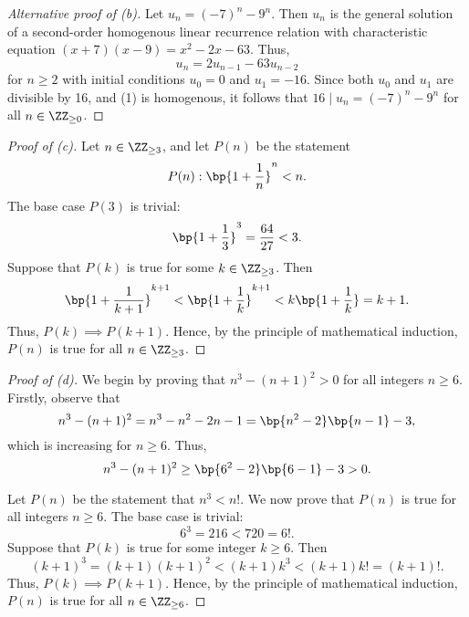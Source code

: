 \begin{proof}[Alternative proof of \emph(b)]
    Let $u_n = (-7)^n - 9^n$. Then $u_n$ is the general solution of a second-order homogenous linear recurrence relation with characteristic equation $(x+7)(x-9) = x^2 - 2x - 63$. Thus, \[u_n = 2u_{n-1} - 63 u_{n-2} \tag{1}\] for $n \geq 2$ with initial conditions $u_0 = 0$ and $u_1 = -16$. Since both $u_0$ and $u_1$ are divisible by 16, and (1) is homogenous, it follows that $16 \mid u_n = (-7)^n - 9^n$ for all $n \in \ZZ_{\geq 0}$.
\end{proof}
\begin{proof}[Proof of \emph{(c)}]
    Let $n \in \ZZ_{\geq 3}$, and let $P(n)$ be the statement \[P(n) : \bp{1 + \frac1n}^n < n.\] The base case $P(3)$ is trivial: \[\bp{1 + \frac13}^3 = \frac{64}{27} < 3.\] Suppose that $P(k)$ is true for some $k \in \ZZ_{\geq 3}$. Then \[\bp{1 + \frac1{k+1}}^{k+1} < \bp{1 + \frac1k}^{k+1} < k \bp{1 + \frac1k} = k + 1.\] Thus, $P(k) \implies P(k+1)$. Hence, by the principle of mathematical induction, $P(n)$ is true for all $n \in \ZZ_{\geq 3}$.
\end{proof}
\begin{proof}[Proof of \emph(d)]
    We begin by proving that $n^3 - (n + 1)^2 > 0$ for all integers $n \geq 6$. Firstly, observe that \[n^3 - (n+1)^2 = n^3 - n^2 - 2n - 1 = \bp{n^2 - 2}\bp{n - 1} - 3,\] which is increasing for $n \geq 6$. Thus, \[n^3 - (n+1)^2 \geq \bp{6^2 - 2} \bp{6 - 1} - 3 > 0.\]

    Let $P(n)$ be the statement that $n^3 < n!$. We now prove that $P(n)$ is true for all integers $n \geq 6$. The base case is trivial: \[6^3 = 216 < 720 = 6!.\] Suppose that $P(k)$ is true for some integer $k \geq 6$. Then \[(k+1)^3 = (k+1) (k+1)^2 < (k+1) k^3 < (k+1) k! = (k+1)!.\] Thus, $P(k) \implies P(k+1)$. Hence, by the principle of mathematical induction, $P(n)$ is true for all $n \in \ZZ_{\geq 6}$.
\end{proof}

